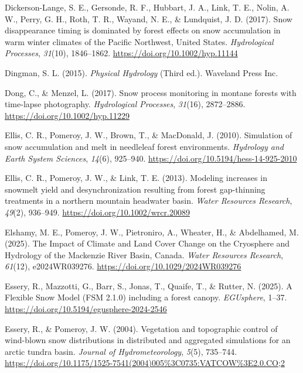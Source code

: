 \documentclass[
  letterpaper,
]{tex/uofsthesis-cs}
\newlength{\cslhangindent}
\newenvironment{CSLReferences}[2] %
 {\begin{list}{}{%
  \setlength{\itemindent}{0pt}
  \setlength{\leftmargin}{0pt}
  \setlength{\parsep}{0pt}
  \ifodd #1
   \setlength{\leftmargin}{\cslhangindent}
   \setlength{\itemindent}{-1\cslhangindent}
  \fi
  \setlength{\itemsep}{#2\baselineskip}}}
 {\end{list}}
\begin{document}
\begin{CSLReferences}{1}{0}
Dickerson-Lange, S. E., Gersonde, R. F., Hubbart, J. A., Link, T. E.,
Nolin, A. W., Perry, G. H., Roth, T. R., Wayand, N. E., \& Lundquist, J.
D. (2017). Snow disappearance timing is dominated by forest effects on
snow accumulation in warm winter climates of the {Pacific Northwest},
{United States}. \emph{Hydrological Processes}, \emph{31}(10),
1846--1862. \url{https://doi.org/10.1002/hyp.11144}

Dingman, S. L. (2015). \emph{Physical {Hydrology}} (Third ed.). Waveland
Press Inc.

Dong, C., \& Menzel, L. (2017). Snow process monitoring in montane
forests with time-lapse photography. \emph{Hydrological Processes},
\emph{31}(16), 2872--2886. \url{https://doi.org/10.1002/hyp.11229}

Ellis, C. R., Pomeroy, J. W., Brown, T., \& MacDonald, J. (2010).
Simulation of snow accumulation and melt in needleleaf forest
environments. \emph{Hydrology and Earth System Sciences}, \emph{14}(6),
925--940. \url{https://doi.org/10.5194/hess-14-925-2010}

Ellis, C. R., Pomeroy, J. W., \& Link, T. E. (2013). Modeling increases
in snowmelt yield and desynchronization resulting from forest
gap-thinning treatments in a northern mountain headwater basin.
\emph{Water Resources Research}, \emph{49}(2), 936--949.
\url{https://doi.org/10.1002/wrcr.20089}

Elshamy, M. E., Pomeroy, J. W., Pietroniro, A., Wheater, H., \&
Abdelhamed, M. (2025). The {Impact} of {Climate} and {Land Cover Change}
on the {Cryosphere} and {Hydrology} of the {Mackenzie River Basin},
{Canada}. \emph{Water Resources Research}, \emph{61}(12), e2024WR039276.
\url{https://doi.org/10.1029/2024WR039276}

Essery, R., Mazzotti, G., Barr, S., Jonas, T., Quaife, T., \& Rutter, N.
(2025). A {Flexible Snow Model} ({FSM} 2.1.0) including a forest canopy.
\emph{EGUsphere}, 1--37.
\url{https://doi.org/10.5194/egusphere-2024-2546}

Essery, R., \& Pomeroy, J. W. (2004). Vegetation and topographic control
of wind-blown snow distributions in distributed and aggregated
simulations for an arctic tundra basin. \emph{Journal of
Hydrometeorology}, \emph{5}(5), 735--744.
\url{https://doi.org/10.1175/1525-7541(2004)005\%3C0735:VATCOW\%3E2.0.CO;2}


\end{CSLReferences}
\end{document}
